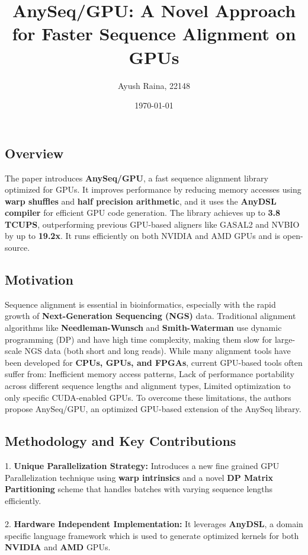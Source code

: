 \documentclass{article}
\title{AnySeq/GPU: A Novel Approach for Faster Sequence Alignment on GPUs}
\author{Ayush Raina, 22148}
\date{\today}
\begin{document}
 

\maketitle

\subsection*{Overview}
The paper introduces \textbf{AnySeq/GPU}, a fast sequence alignment library optimized for GPUs. It improves performance by reducing memory accesses using \textbf{warp shuffles} and \textbf{half precision arithmetic}, and it uses the \textbf{AnyDSL compiler} for efficient GPU code generation. The library achieves up to \textbf{3.8 TCUPS}, outperforming previous GPU-based aligners like GASAL2 and NVBIO by up to \textbf{19.2x}. It runs efficiently on both NVIDIA and AMD GPUs and is open-source.

\subsection*{Motivation}
Sequence alignment is essential in bioinformatics, especially with the rapid growth of \textbf{Next-Generation Sequencing (NGS)} data. Traditional alignment algorithms like \textbf{Needleman-Wunsch} and \textbf{Smith-Waterman} use dynamic programming (DP) and have high time complexity, making them slow for large-scale NGS data (both short and long reads). While many alignment tools have been developed for \textbf{CPUs, GPUs, and FPGAs}, current GPU-based tools often suffer from:
    Inefficient memory access patterns,
    Lack of performance portability across different sequence lengths and alignment types,
    Limited optimization to only specific CUDA-enabled GPUs.
To overcome these limitations, the authors propose AnySeq/GPU, an optimized GPU-based extension of the AnySeq library.

\subsection*{Methodology and Key Contributions}
1. \textbf{Unique Parallelization Strategy: }Introduces a new fine grained GPU Parallelization technique using \textbf{warp intrinsics} and a novel \textbf{DP Matrix Partitioning} scheme that handles batches with varying sequence lengths efficiently. \\ \\ 
2. \textbf{Hardware Independent Implementation: }It leverages \textbf{AnyDSL}, a domain specific language framework which is used to generate optimized kernels for both \textbf{NVIDIA} and \textbf{AMD} GPUs.
\end{document}
